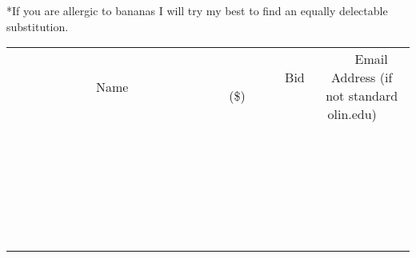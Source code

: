 \documentclass[11pt]{article}
\begin{document}
*If you are allergic to bananas I will try my best to find an equally delectable substitution.
\\[6ex]
\begin{tabular}{c c c}
~~~~~~~~~~~~~Name~~~~~~~~~~~~~ & ~~~~~~~~~Bid (\$)~~~~~~~~~  & ~~~Email Address (if not standard olin.edu)~~~\\
 & & \\
\hline
 & & \\
\hline
 & & \\
\hline
 & & \\
\hline
 & & \\
\hline
 & & \\
\hline
 & & \\
\hline
 & & \\
\hline
 & & \\
\hline
 & & \\
\hline
 & & \\
\hline
 & & \\
\hline
 & & \\
\hline
 & & \\
\hline
 & & \\
\hline
 & & \\
\hline
 & & \\
\hline
 & & \\
\hline
 & & \\
\hline
 & & \\
\hline
 & & \\
\hline
 & & \\
\hline
 & & \\
\hline
 & & \\
\hline
 & & \\
\hline
 & & \\
\hline
\end{tabular}
\newpage
\end{document}
